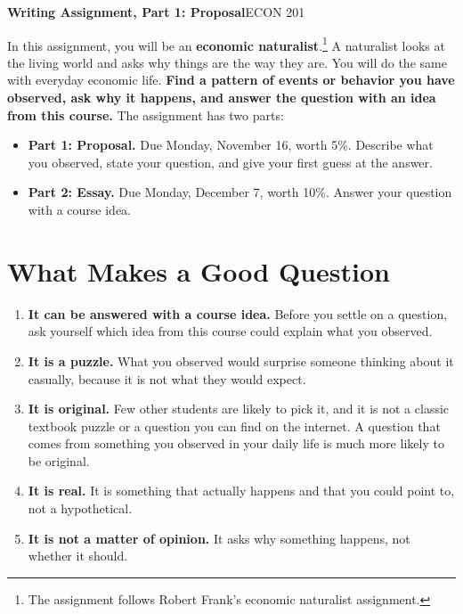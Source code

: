 \documentclass[11pt]{article}
\begin{document}
{\LARGE\bfseries\color{accent}Writing Assignment, Part 1: Proposal}\hfill{\large\color{muted}ECON 201}\par
{}\par
{}\par
\vspace{4pt}

In this assignment, you will be an \textbf{economic naturalist}.\footnote{The assignment follows Robert Frank's economic naturalist assignment.} A naturalist looks at the living world and asks why things are the way they are. You will do the same with everyday economic life. \textbf{Find a pattern of events or behavior you have observed, ask why it happens, and answer the question with an idea from this course.} The assignment has two parts:

\begin{itemize}
  \item \textbf{Part 1: Proposal.} Due Monday, November 16, worth 5\%. Describe what you observed, state your question, and give your first guess at the answer.
  \item \textbf{Part 2: Essay.} Due Monday, December 7, worth 10\%. Answer your question with a course idea.
\end{itemize}

\section{What Makes a Good Question}

\begin{enumerate}
  \item \textbf{It can be answered with a course idea.} Before you settle on a question, ask yourself which idea from this course could explain what you observed.
  \item \textbf{It is a puzzle.} What you observed would surprise someone thinking about it casually, because it is not what they would expect.
  \item \textbf{It is original.} Few other students are likely to pick it, and it is not a classic textbook puzzle or a question you can find on the internet. A question that comes from something you observed in your daily life is much more likely to be original.
  \item \textbf{It is real.} It is something that actually happens and that you could point to, not a hypothetical.
  \item \textbf{It is not a matter of opinion.} It asks why something happens, not whether it should.
\end{enumerate}
\end{document}
